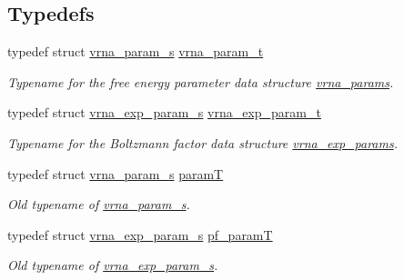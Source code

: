 \subsection*{Typedefs}
\begin{DoxyCompactItemize}
\item 
\mbox{\label{group__energy__parameters_ga8a69ca7d787e4fd6079914f5343a1f35}} 
typedef struct \hyperlink{group__energy__parameters_structvrna__param__s}{vrna\+\_\+param\+\_\+s} \hyperlink{group__energy__parameters_ga8a69ca7d787e4fd6079914f5343a1f35}{vrna\+\_\+param\+\_\+t}
\begin{DoxyCompactList}\small\item\em Typename for the free energy parameter data structure \hyperlink{group__energy__parameters_gad0e3e7e74bdc50d1709d40c92993185e}{vrna\+\_\+params}. \end{DoxyCompactList}\item 
\mbox{\label{group__energy__parameters_ga01d8b92fe734df8d79a6169482c7d8d8}} 
typedef struct \hyperlink{group__energy__parameters_structvrna__exp__param__s}{vrna\+\_\+exp\+\_\+param\+\_\+s} \hyperlink{group__energy__parameters_ga01d8b92fe734df8d79a6169482c7d8d8}{vrna\+\_\+exp\+\_\+param\+\_\+t}
\begin{DoxyCompactList}\small\item\em Typename for the Boltzmann factor data structure \hyperlink{group__energy__parameters_gab1f3016f96aa96bff020cdd904605afa}{vrna\+\_\+exp\+\_\+params}. \end{DoxyCompactList}\item 
typedef struct \hyperlink{group__energy__parameters_structvrna__param__s}{vrna\+\_\+param\+\_\+s} \hyperlink{group__energy__parameters_ga857dde86357d306cc902f0d8b2797659}{paramT}
\begin{DoxyCompactList}\small\item\em Old typename of \hyperlink{group__energy__parameters_structvrna__param__s}{vrna\+\_\+param\+\_\+s}. \end{DoxyCompactList}\item 
typedef struct \hyperlink{group__energy__parameters_structvrna__exp__param__s}{vrna\+\_\+exp\+\_\+param\+\_\+s} \hyperlink{group__energy__parameters_ga8bffe1828e2cbec101769f5cc0b1535b}{pf\+\_\+paramT}
\begin{DoxyCompactList}\small\item\em Old typename of \hyperlink{group__energy__parameters_structvrna__exp__param__s}{vrna\+\_\+exp\+\_\+param\+\_\+s}. \end{DoxyCompactList}\end{DoxyCompactItemize}
